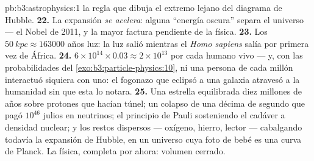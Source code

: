 \begin{solution}{pb:b3:astrophysics:1}
la regla que dibuja el extremo lejano del diagrama de Hubble.
\textbf{22.} La expansión \emph{se acelera}: alguna
``energía oscura'' separa el universo --- el Nobel de 2011,
y la mayor factura pendiente de la física.
\textbf{23.} Los $\qty{50}{kpc} \approx 163000$ años luz: la
luz salió mientras el \emph{Homo sapiens} salía por primera vez de África.
\textbf{24.} $6\times10^{14}\times0.03 \approx 2\times10^{13}$
por cada humano vivo --- y, con las probabilidades del
\cref{exo:b3:particle-physics:10}, ni una persona de cada
millón interactuó siquiera con uno: el fogonazo que eclipsó a una
galaxia atravesó a la humanidad sin que esta lo notara.
\textbf{25.} Una estrella equilibrada diez millones de años sobre protones
que hacían túnel; un colapso de una décima de segundo que pagó $10^{46}$
julios en neutrinos; el principio de Pauli sosteniendo el cadáver a
densidad nuclear; y los restos dispersos --- oxígeno, hierro,
lector --- cabalgando todavía la expansión de Hubble, en un universo cuya
foto de bebé es una curva de Planck. La física, completa por ahora:
volumen cerrado.
\end{solution}
